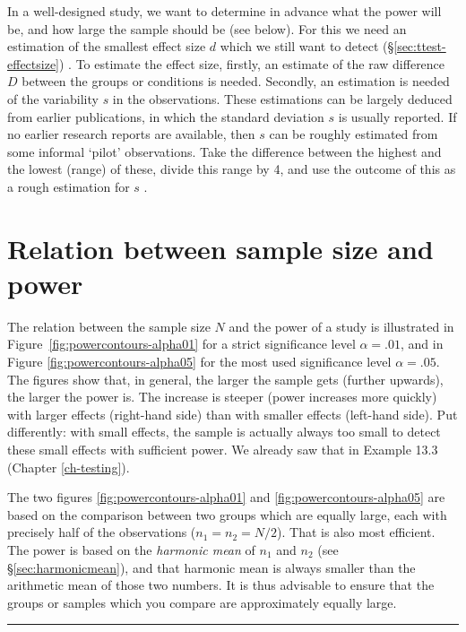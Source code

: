 \documentclass[
]{book}
\begin{document}
In a well-designed study, we want to determine in advance what
the power will be, and how large the sample should be (see below).
For this we need an estimation of the smallest effect size \(d\)
which we still want to detect
(§\ref{sec:ttest-effectsize}) \citep{Quene10}. To estimate the effect size, firstly,
an estimate of the raw difference \(D\) between the groups or conditions is needed.
Secondly, an estimation is needed of the variability \(s\)
in the observations. These estimations can be largely deduced from
earlier publications, in which the standard deviation
\(s\) is usually reported. If no earlier research reports are available,
then \(s\) can be roughly estimated from some informal
`pilot' observations. Take the difference between the highest and the lowest
(range) of these, divide this range by 4, and use the outcome of this as
a rough estimation for \(s\) \citep{PD08}.

\hypertarget{sec:samplesize-power}{%
\section{Relation between sample size and power}\label{sec:samplesize-power}}

The relation between the sample size \(N\) and the power of a study
is illustrated in
Figure~\ref{fig:powercontours-alpha01} for a strict significance
level \(\alpha=.01\), and in
Figure \ref{fig:powercontours-alpha05} for the most used
significance level \(\alpha=.05\). The figures show that, in general, the larger the
sample gets (further upwards), the larger the power is.
The increase is steeper (power increases more quickly) with larger
effects (right-hand side) than with smaller effects (left-hand side). Put differently:
with small effects, the sample is actually always too small to detect
these small effects with sufficient power. We already saw that in
Example 13.3 (Chapter \ref{ch-testing}).

The two figures \ref{fig:powercontours-alpha01} and
\ref{fig:powercontours-alpha05} are based on the comparison between two groups which are equally large, each with
precisely half of the observations (\(n_1=n_2=N/2\)). That is also most efficient.
The power is based on the \emph{harmonic mean} of \(n_1\) and \(n_2\) (see §\ref{sec:harmonicmean}), and
that harmonic mean is always smaller than the arithmetic mean of those two numbers. It is thus
advisable to ensure that the groups or samples which you compare are approximately equally large.

\begin{center}\rule{0.5\linewidth}{0.5pt}\end{center}
\end{document}
